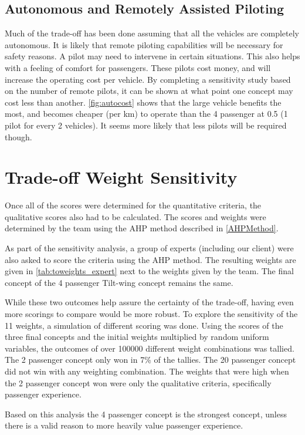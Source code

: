 \subsection{Autonomous and Remotely Assisted Piloting}
Much of the trade-off has been done assuming that all the vehicles are completely autonomous. It is likely that remote piloting capabilities will be necessary for safety reasons. A pilot may need to intervene in certain situations. This also helps with a feeling of comfort for passengers. These pilots cost money, and will increase the operating cost per vehicle. By completing a sensitivity study based on the number of remote pilots, it can be shown at what point one concept may cost less than another. \autoref{fig:autocost} shows that the large vehicle benefits the most, and becomes cheaper (per km) to operate than the 4 passenger at 0.5 (1 pilot for every 2 vehicles). It seems more likely that less pilots will be required though.

\section{Trade-off Weight Sensitivity}

Once all of the scores were determined for the quantitative criteria, the qualitative scores also had to be calculated. The scores and weights were determined by the team using the AHP method described in \autoref{AHPMethod}. 

As part of the sensitivity analysis, a group of experts (including our client) were also asked to score the criteria using the AHP method. The resulting weights are given in \autoref{tab:toweights_expert} next to the weights given by the team. The final concept of the 4 passenger Tilt-wing concept remains the same.

While these two outcomes help assure the certainty of the trade-off, having even more scorings to compare would be more robust. To explore the sensitivity of the 11 weights, a simulation of different scoring was done. Using the scores of the three final concepts and the initial weights multiplied by random uniform variables, the outcomes of over 100000 different weight combinations was tallied. The 2 passenger concept only won in 7\% of the tallies. The 20 passenger concept did not win with any weighting combination. The weights that were high when the 2 passenger concept won were only the qualitative criteria, specifically passenger experience. 

Based on this analysis the 4 passenger concept is the strongest concept, unless there is a valid reason to more heavily value passenger experience.

